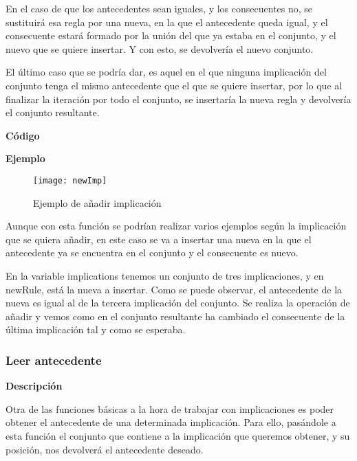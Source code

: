     En el caso de que los antecedentes sean iguales, y los consecuentes no, se sustituir\'a esa regla por una nueva, en la que el antecedente 
    queda igual, y el consecuente estar\'a formado por la uni\'on del que ya estaba en el conjunto, y el nuevo que se quiere insertar. Y con 
    esto, se devolver\'ia el nuevo conjunto.

    El \'ultimo caso que se podr\'ia dar, es aquel en el que ninguna implicaci\'on del conjunto tenga el mismo antecedente que el que se 
    quiere insertar, por lo que al finalizar la iteraci\'on por todo el conjunto, se insertar\'ia la nueva regla y devolver\'ia el conjunto 
    resultante.
    \\

    \clearpage

    \textbf{C\'odigo}

    
    \bigskip

    \textbf{Ejemplo}


    \begin{figure}[H]
        \centering
        \texttt{[image: newImp]}
        \caption{Ejemplo de a\~nadir implicaci\'on}
        \label{fig:newImp}
    \end{figure}

    Aunque con esta funci\'on se podr\'ian realizar varios ejemplos seg\'un la implicaci\'on que se quiera a\~nadir, en este caso se 
    va a insertar una nueva en la que el antecedente ya se encuentra en el conjunto y el consecuente es nuevo.

    En la variable implications tenemos un conjunto de tres implicaciones, y en newRule, est\'a la nueva a insertar. Como se puede 
    observar, el antecedente de la nueva es igual al de la tercera implicaci\'on del conjunto. Se realiza la operaci\'on de a\~nadir 
    y vemos como en el conjunto resultante ha cambiado el consecuente de la \'ultima implicaci\'on tal y como se esperaba.



\subsubsection{Leer antecedente}

    \textbf{Descripci\'on}

    Otra de las funciones b\'asicas a la hora de trabajar con implicaciones es poder obtener el antecedente de una determinada 
    implicaci\'on. Para ello, pas\'andole a esta funci\'on el conjunto que contiene a la implicaci\'on que queremos obtener, y su 
    posici\'on, nos devolver\'a el antecedente deseado.
    \\


